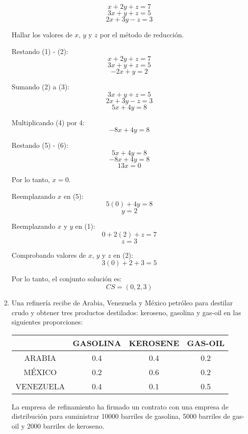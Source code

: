 \documentclass[12pt,a4paper]{article}
\begin{document}
\begin{enumerate}
\begin{multicols}{2}
    \[
    x + 2y + z = 7 \tag{1}
    \]
    \[
    3x + y + z = 5 \tag{2}
    \]
    \[
    2x + 3y - z = 3 \tag{3}
    \]
    
    Hallar los valores de \(x\), \(y\) y \(z\) por el método de reducción.
    
    Restando (1) - (2):
    \[
    x + 2y + z = 7 \tag{1}
    \]
    \[
    3x + y + z = 5 \tag{2}
    \]
    \[
    -2x + y = 2 \tag{4}
    \]
    
    Sumando (2) a (3):
    \[
    3x + y + z = 5 \tag{2}
    \]
    \[
    2x + 3y - z = 3 \tag{3}
    \]
    \[
    5x + 4y = 8 \tag{5}
    \]
    
    Multiplicando (4) por 4:
    \[
    -8x + 4y = 8 \tag{6}
    \]
    
    Restando (5) - (6):
    \[
    5x + 4y = 8 \tag{5}
    \]
    \[
    -8x + 4y = 8 \tag{6}
    \]
    \[
    13x = 0 \tag{7}
    \]
    
    Por lo tanto, \(x = 0\).
    
    Reemplazando \(x\) en (5):
    \[
    5(0) + 4y = 8 \tag{5}
    \]
    \[
    y = 2
    \]
    
    Reemplazando \(x\) y \(y\) en (1):
    \[
    0 + 2(2) + z = 7 \tag{1}
    \]
    \[
    z = 3
    \]
    
    Comprobando valores de \(x\), \(y\) y \(z\) en (2):
    \[
    3(0) + 2 + 3 = 5 \tag{2}
    \]
    
    Por lo tanto, el conjunto solución es:
    \[
    CS = (0, 2, 3)
    \]
    \end{multicols}
    
    \item Una refinería recibe de Arabia, Venezuela y México petróleo para destilar crudo y obtener tres productos destilados: keroseno, gasolina y gas-oil en las siguientes proporciones:
    
    \begin{center}
    \begin{tabular}{|c|c|c|c|}
    \hline
    & GASOLINA & KEROSENE & GAS-OIL \\
    \hline
    ARABIA & 0.4 & 0.4 & 0.2 \\
    MÉXICO & 0.2 & 0.6 & 0.2 \\
    VENEZUELA & 0.4 & 0.1 & 0.5 \\
    \hline
    \end{tabular}
    \end{center}
    
    La empresa de refinamiento ha firmado un contrato con una empresa de distribución para suministrar 10000 barriles de gasolina, 5000 barriles de gas-oil y 2000 barriles de keroseno.
    

\end{enumerate}
\end{document}
